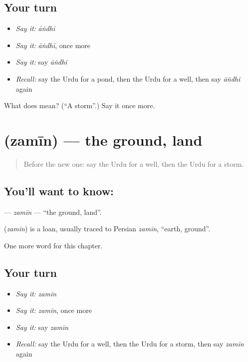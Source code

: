 \subsection*{Your turn}
\begin{itemize}
\raggedright
  \item \emph{Say it:} \emph{āṅdhī}
  \item \emph{Say it:} \emph{āṅdhī}, once more
  \item \emph{Say it:} say \emph{āṅdhī}
  \item \emph{Recall:} say the Urdu for a pond, then the Urdu for a well, then say \emph{āṅdhī} again
\end{itemize}

\begin{tcolorbox}[breakable,colback=teal!4,colframe=teal!35!black,title={Before you move on}]
What does  mean? (\textquotedblleft{}A storm\textquotedblright{}.) Say it once more.
\end{tcolorbox}
\section[\texorpdfstring{\ur{زمین} (zamīn)}{زمین (zamīn)}]{ (zamīn) — the ground, land}

\label{lesson:UR-C125-zamin}



\begin{quote}
Before the new one: say the Urdu for a well, then the Urdu for a storm.
\end{quote}

\subsection*{You'll want to know: }
\textbf{} — \emph{zamīn} — \textquotedblleft{}the ground, land\textquotedblright{}.

\begin{cousinweb}
\textbf{} (\emph{zamīn}) is a loan, usually traced to Persian \emph{zamīn}, \textquotedblleft{}earth, ground\textquotedblright{}.
\end{cousinweb}

\begin{grammarlens}[title={What you've built}]
One more word for this chapter.
\end{grammarlens}

\subsection*{Your turn}
\begin{itemize}
\raggedright
  \item \emph{Say it:} \emph{zamīn}
  \item \emph{Say it:} \emph{zamīn}, once more
  \item \emph{Say it:} say \emph{zamīn}
  \item \emph{Recall:} say the Urdu for a well, then the Urdu for a storm, then say \emph{zamīn} again
\end{itemize}

